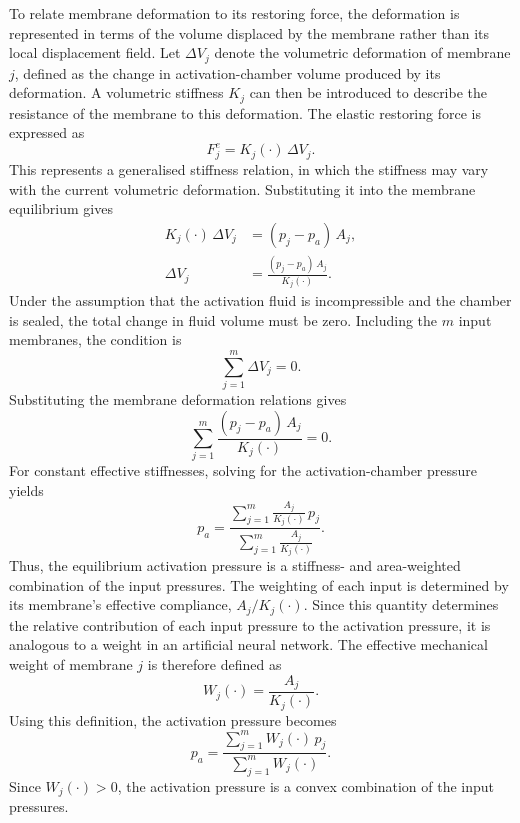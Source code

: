 \documentclass[11pt,a4paper]{article}
\numberwithin{equation}{section}
\begin{document}
To relate membrane deformation to its restoring force, the deformation is represented in terms of the volume
displaced by the membrane rather than its local displacement field. Let $\Delta V_j$ denote the volumetric
deformation of membrane $j$, defined as the change in activation-chamber volume produced by its deformation. A
volumetric stiffness $K_j$ can then be introduced to describe the resistance of the membrane to this deformation.
The elastic restoring force is expressed as
\begin{equation}
  F_j^{e} = K_j(\cdot)\,\Delta V_j .
  \label{eq:volumetric-stiffness}
\end{equation}
This represents a generalised stiffness relation, in which the stiffness may vary with the current volumetric
deformation. Substituting it into the membrane equilibrium gives
\begin{subequations}
\begin{align}
  K_j(\cdot)\,\Delta V_j &= (p_j - p_a)\,A_j, \label{eq:dv-a}\\
  \Delta V_j &= \frac{(p_j - p_a)\,A_j}{K_j(\cdot)} . \label{eq:dv-b}
\end{align}
\end{subequations}
Under the assumption that the activation fluid is incompressible and the chamber is sealed, the total change in
fluid volume must be zero. Including the $m$ input membranes, the condition is
\begin{equation}
  \sum_{j=1}^{m} \Delta V_j = 0 .
  \label{eq:volume-conservation}
\end{equation}
Substituting the membrane deformation relations gives
\begin{equation}
  \sum_{j=1}^{m} \frac{(p_j - p_a)\,A_j}{K_j(\cdot)} = 0 .
  \label{eq:volume-balance}
\end{equation}
For constant effective stiffnesses, solving for the activation-chamber pressure yields
\begin{equation}
  p_a = \frac{\displaystyle\sum_{j=1}^{m} \frac{A_j}{K_j(\cdot)}\,p_j}{\displaystyle\sum_{j=1}^{m} \frac{A_j}{K_j(\cdot)}} .
  \label{eq:pa-compliance}
\end{equation}
Thus, the equilibrium activation pressure is a stiffness- and area-weighted combination of the input pressures. The
weighting of each input is determined by its membrane's effective compliance, $A_j/K_j(\cdot)$. Since this quantity
determines the relative contribution of each input pressure to the activation pressure, it is analogous to a weight
in an artificial neural network. The effective mechanical weight of membrane $j$ is therefore defined as
\begin{equation}
  W_j(\cdot) = \frac{A_j}{K_j(\cdot)} .
  \label{eq:weight}
\end{equation}
Using this definition, the activation pressure becomes
\begin{equation}
  p_a = \frac{\sum_{j=1}^{m} W_j(\cdot)\,p_j}{\sum_{j=1}^{m} W_j(\cdot)} .
  \label{eq:pa-weights}
\end{equation}
Since $W_j(\cdot) > 0$, the activation pressure is a convex combination of the input pressures.
\end{document}
